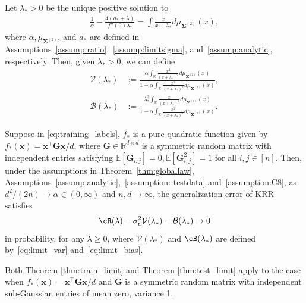 \documentclass[twoside,11pt]{article}
\newcommand{\bepsilon}{\boldsymbol{\epsilon}}
\newcommand{\R}{\mathbb{R}}
\newcommand{\E}{\mathbb{E}}
\def\bG{{\boldsymbol G}}
\def\bx{{\boldsymbol x}}
\def\bSigma{{\boldsymbol \Sigma}}
\def\cV{{\mathcal V}}
\def\cV{{\mathcal V}}
\newcommand{\1}{\mathbf{1}}
\begin{document}
Let $\lambda_*>0$ be the unique positive solution to
\begin{align}\label{eq:self_consist}
   \frac{1}{\alpha}- \frac{4 (a_*+\lambda) }{f''(0)\lambda_*} = \int \frac{x}{x+\lambda_*}d\mu_{\bSigma^{(2)}}(x),
\end{align}
where $\alpha, \mu_{\bSigma^{(2)}}$, and $a_*$ are defined in Assumptions~\ref{assump:ratio},~\ref{assump:limitsigma}, and~\ref{assump:analytic}, respectively. 
Then, given $\lambda_*>0$, we can define 
\begin{align}
    \cV(\lambda_*) &:= \frac{\alpha\int_{\R}\frac{x^2}{(x+\lambda_*)^2} d\mu_{\bSigma^{(2)}}( x)}{1-\alpha\int_{\R}\frac{x^2}{(x+\lambda_*)^2}d\mu_{\bSigma^{(2)}}( x)},\label{eq:limit_var}\\
    \mathcal{B}(\lambda_*) &:= \frac{ \lambda_*^2\int_{\R}\frac{x }{(x+\lambda_*)^2}d\mu_{\bSigma^{(2)}}(x)}{1-\alpha\int_{\R}\frac{x^2}{(x+\lambda_*)^2}d\mu_{\bSigma^{(2)}}( x)}.\label{eq:limit_bias}
\end{align} 

\begin{theorem}\label{thm:test_limit}
Suppose  in \eqref{eq:training_labels}, $f_*$ is a pure quadratic function given by $f_*(\bx)=\bx^\top\bG\bx/d$, where $\bG\in\R^{d\times d} $ is a symmetric random matrix with independent entries satisfying $\E[\bG_{i,j}]=0, \E[\bG_{i,j}^2]=1$
for all $i,j\in[n]$. 
Then, under  the assumptions in Theorem~\ref{thm:globallaw}, Assumptions~\ref{assump:analytic},~\ref{assumption: testdata} and~\ref{assumption:C8}, as $d^2/(2n)\to \alpha\in (0,\infty)$ and $n,d\to \infty$, the generalization error of KRR satisfies 
\begin{equation}
    \cR(\lambda)-\sigma_{\bepsilon}^2\cV(\lambda_*)- \mathcal{B}(\lambda_*)\to 0
\end{equation}
in probability, for any $\lambda\ge 0$, where $\cV(\lambda_*)$ and $\cB(\lambda_*)$ are defined by~\eqref{eq:limit_var} and~\eqref{eq:limit_bias}.
\end{theorem}
Both Theorem \ref{thm:train_limit} and Theorem \ref{thm:test_limit} apply to the case when $f_*(\bx)=\bx^\top\bG\bx/d$ and $\bG$ is a symmetric random matrix with independent sub-Gaussian entries of mean zero, variance 1.
\end{document}
